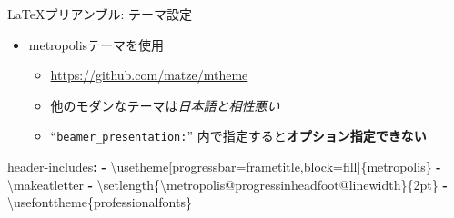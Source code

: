 \documentclass[
  12pt,
  ignorenonframetext,
]{beamer}
\newenvironment{Shaded}{\begin{snugshade}}{\end{snugshade}}
\newcommand{\AttributeTok}[1]{\textcolor[rgb]{0.77,0.63,0.00}{#1}}
\newcommand{\FunctionTok}[1]{\textcolor[rgb]{0.00,0.00,0.00}{#1}}
\newcommand{\KeywordTok}[1]{\textcolor[rgb]{0.13,0.29,0.53}{\textbf{#1}}}
\providecommand{\tightlist}{%
  \setlength{\itemsep}{0pt}\setlength{\parskip}{0pt}}
\begin{document}
\begin{frame}[fragile]{\LaTeX プリアンブル: テーマ設定}
\protect\hypertarget{ux30d7ux30eaux30a2ux30f3ux30d6ux30eb-ux30c6ux30fcux30deux8a2dux5b9a}{}

\begin{itemize}
\tightlist
\item
  metropolisテーマを使用

  \begin{itemize}
  \tightlist
  \item
    \url{https://github.com/matze/mtheme}
  \item
    他のモダンなテーマは\emph{日本語と相性悪い}
  \item
    ``\texttt{beamer\_presentation:}''
    内で指定すると\textbf{オプション指定できない}
  \end{itemize}
\end{itemize}

\begin{Shaded}
\begin{Highlighting}[]
\FunctionTok{header-includes}\KeywordTok{:}
\AttributeTok{  }\KeywordTok{-}\AttributeTok{ \textbackslash{}usetheme[progressbar=frametitle,block=fill]\{metropolis\}}
\AttributeTok{  }\KeywordTok{-}\AttributeTok{ \textbackslash{}makeatletter}
\AttributeTok{  }\KeywordTok{-}\AttributeTok{ \textbackslash{}setlength\{\textbackslash{}metropolis@progressinheadfoot@linewidth\}\{2pt\}}
\AttributeTok{  }\KeywordTok{-}\AttributeTok{ \textbackslash{}usefonttheme\{professionalfonts\}}
\end{Highlighting}
\end{Shaded}

\end{frame}
\end{document}
